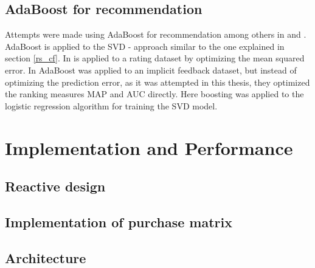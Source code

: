 \documentclass[10pt]{reportMaster}
\begin{document}
\section{AdaBoost for recommendation}
Attempts were made using AdaBoost for recommendation among others in \cite{boostingCFRatings} and \cite{boostingAUC}.
AdaBoost is applied to the SVD - approach similar to the one explained in section \ref{rs_cf}.
In \cite{boostingCFRatings} is applied to a rating dataset by optimizing the mean squared error. %
In \cite{boostingAUC} AdaBoost was applied to an implicit feedback dataset, but instead of optimizing the prediction error, as it was attempted in this thesis, they optimized the ranking measures MAP and AUC directly. %
Here boosting was applied to the logistic regression algorithm for training the SVD model.












\chapter{Implementation and Performance}

\section{Reactive design}

\section{Implementation of purchase matrix}

\section{Architecture}
\end{document}
